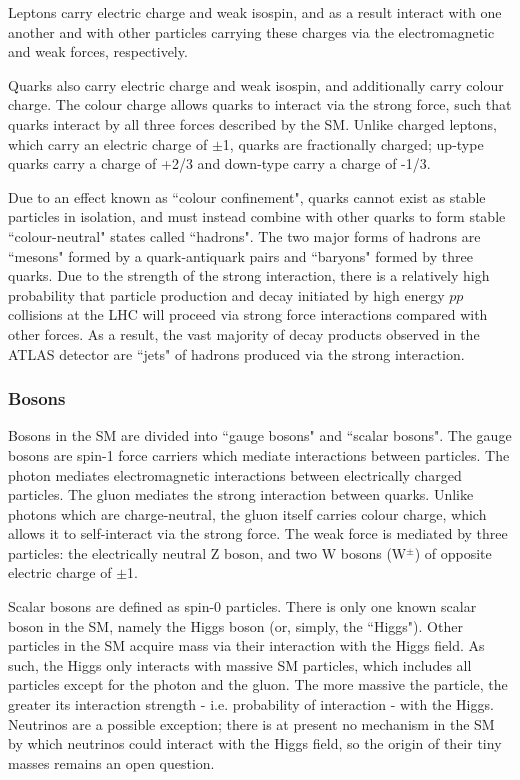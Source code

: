 \documentclass[12pt]{article}
\begin{document}
Leptons carry electric charge and weak isospin, and as a result interact with one another and with other particles carrying these charges via the electromagnetic and weak forces, respectively.  

Quarks also carry electric charge and weak isospin, and additionally carry colour charge. The colour charge allows quarks to interact via the strong force, such that quarks interact by all three forces described by the SM. Unlike charged leptons, which carry an electric charge of $\pm$1, quarks are fractionally charged; up-type quarks carry a charge of +2/3 and down-type carry a charge of -1/3.

Due to an effect known as ``colour confinement", quarks cannot exist as stable particles in isolation, and must instead combine with other quarks to form stable ``colour-neutral" states called ``hadrons". The two major forms of hadrons are ``mesons" formed by a quark-antiquark pairs and ``baryons" formed by three quarks. Due to the strength of the strong interaction, there is a relatively high probability that particle production and decay initiated by high energy $pp$ collisions at the LHC will proceed via strong force interactions compared with other forces. As a result, the vast majority of decay products observed in the ATLAS detector are ``jets" of hadrons produced via the strong interaction. 

\subsubsection{Bosons}

Bosons in the SM are divided into ``gauge bosons" and ``scalar bosons". The gauge bosons are spin-1 force carriers which mediate interactions between particles. The photon mediates electromagnetic interactions between electrically charged particles. The gluon mediates the strong interaction between quarks. Unlike photons which are charge-neutral, the gluon itself carries colour charge, which allows it to self-interact via the strong force. The weak force is mediated by three particles: the electrically neutral Z boson, and two W bosons (W$^\pm$) of opposite electric charge of $\pm$1. 

Scalar bosons are defined as spin-0 particles. There is only one known scalar boson in the SM, namely the Higgs boson (or, simply, the ``Higgs"). Other particles in the SM acquire mass via their interaction with the Higgs field. As such, the Higgs only interacts with massive SM particles, which includes all particles except for the photon and the gluon. The more massive the particle, the greater its interaction strength - i.e. probability of interaction - with the Higgs. Neutrinos are a possible exception; there is at present no mechanism in the SM by which neutrinos could interact with the Higgs field, so the origin of their tiny masses remains an open question.  
\end{document}
